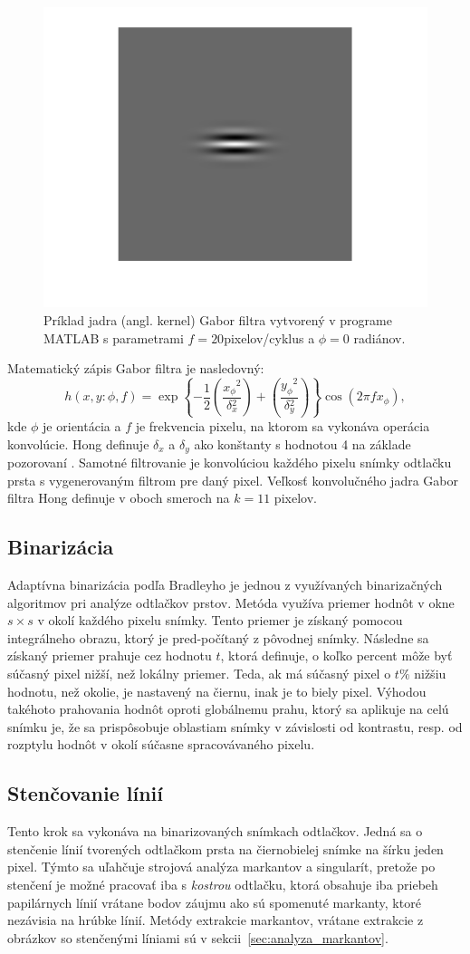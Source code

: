   \begin{figure}[h]
    \centering
    \includegraphics[width=0.25\linewidth]{obrazky-figures/gabor_kernel.png}
    \caption{Príklad jadra (angl. kernel) Gabor filtra vytvorený v programe MATLAB s parametrami $f = 20$pixelov/cyklus a $\phi{} = 0$ radiánov.}
    \label{obr:gabor_kernel}
  \end{figure}
  Matematický zápis Gabor filtra je nasledovný:
  \begin{equation}
    h(x,y: \phi{}, f) = \exp{\left\{ -\frac{1}{2} \left( \frac{x_\phi{}^2}{\delta{}_x^2} \right) + \left( \frac{y_\phi{}^2}{\delta{}_y^2} \right) \right\}} \cos{}\left(2\pi{}fx_\phi{}\right),
  \end{equation}
  kde $\phi{}$ je orientácia a $f$ je frekvencia pixelu, na ktorom sa vykonáva operácia konvolúcie. Hong definuje $\delta{}_x$ a $\delta{}_y$
  ako konštanty s hodnotou 4 na základe pozorovaní \cite{Hong}. Samotné filtrovanie je konvolúciou každého pixelu snímky odtlačku prsta s vygenerovaným filtrom
  pre daný pixel. Veľkosť konvolučného jadra Gabor filtra Hong definuje v oboch smeroch na $k = 11$ pixelov.

  \subsection{Binarizácia}
  Adaptívna binarizácia podľa Bradleyho \cite{bradley2007adaptive} je jednou z využívaných binarizačných algoritmov pri analýze odtlačkov prstov.
  Metóda využíva priemer hodnôt v okne $s \times s$ v okolí každého pixelu snímky. Tento priemer je získaný pomocou integrálneho obrazu, ktorý je pred-počítaný
  z pôvodnej snímky. Následne sa získaný priemer prahuje cez hodnotu $t$, ktorá definuje, o koľko percent môže byť súčasný pixel nižší, než lokálny priemer.
  Teda, ak má súčasný pixel o $t\%$ nižšiu hodnotu, než okolie, je nastavený na čiernu, inak je to biely pixel. Výhodou takéhoto prahovania hodnôt oproti
  globálnemu prahu, ktorý sa aplikuje na celú snímku je, že sa prispôsobuje oblastiam snímky v závislosti od kontrastu, resp. od rozptylu hodnôt v okolí
  súčasne spracovávaného pixelu.

  \subsection{Stenčovanie línií}
  Tento krok sa vykonáva na binarizovaných snímkach odtlačkov. Jedná sa o stenčenie línií tvorených odtlačkom prsta na čiernobielej snímke na šírku
  jeden pixel. Týmto sa uľahčuje strojová analýza markantov a singularít, pretože po stenčení je možné pracovať iba s \emph{kostrou} odtlačku,
  ktorá obsahuje iba priebeh papilárnych línií vrátane bodov záujmu ako sú spomenuté markanty, ktoré nezávisia na hrúbke línií.
  Metódy extrakcie markantov, vrátane extrakcie z obrázkov so stenčenými líniami sú v sekcii~{\ref{sec:analyza_markantov}}.
  
